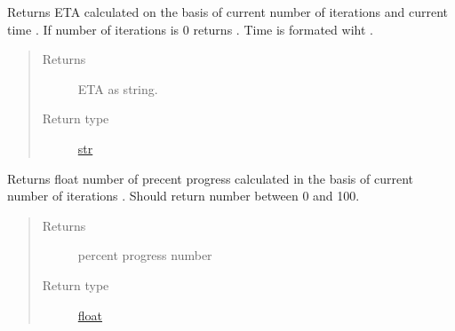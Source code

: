 \documentclass[a4paper,10pt,english]{sphinxmanual}
\begin{document}
\begin{fulllineitems}

\begin{fulllineitems}
\label{aqueduct.utils.log:aqueduct.utils.log.SimpleProgressBar.bar}
\end{fulllineitems}


\begin{fulllineitems}
\label{aqueduct.utils.log:aqueduct.utils.log.SimpleProgressBar.ETA}
Returns ETA calculated on the basis of current number of iterations
 and current time . If number of
iterations is 0 returns .
Time is formated wiht {\hyperref[aqueduct.utils.log:aqueduct.utils.log.smart_time_string]{}}.
\begin{quote}\begin{description}
\item[{Returns}] \leavevmode
ETA as string.

\item[{Return type}] \leavevmode
\href{http://docs.python.org/2/library/functions.html\#str}{str}

\end{description}\end{quote}

\end{fulllineitems}


\begin{fulllineitems}
\label{aqueduct.utils.log:aqueduct.utils.log.SimpleProgressBar.percent}
Returns float number of precent progress calculated in the basis
of current number of iterations . Should return
number between 0 and 100.
\begin{quote}\begin{description}
\item[{Returns}] \leavevmode
percent progress number

\item[{Return type}] \leavevmode
\href{http://docs.python.org/2/library/functions.html\#float}{float}

\end{description}\end{quote}


\end{fulllineitems}
\end{fulllineitems}
\end{document}
